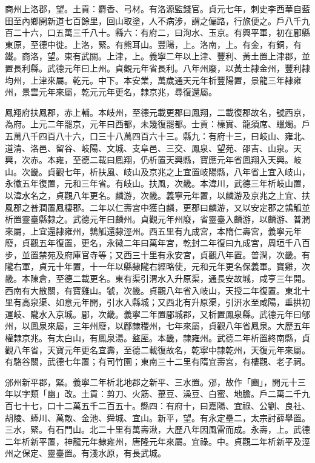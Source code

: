 \begin{pinyinscope}
 商州上洛郡，望。土貢：麝香、弓材。有洛源監錢官。貞元七年，刺史李西華自藍田至內鄉開新道七百餘里，回山取塗，人不病涉，謂之偏路，行旅便之。戶八千九百二十六，口五萬三千八十。縣六：有府二，曰洵水、玉京。有興平軍，初在郿縣東原，至德中徙。上洛，緊。有熊耳山。豐陽，上。洛南，上。有金，有銅，有鐵。商洛，望。東有武關。上津，上。義寧二年以上津、豐利、黃土置上津郡，並置長利縣。武德元年曰上州。貞觀元年省長利。八年州廢，以黃土隸金州，豐利隸均州，上津來屬。乾元。中下。本安業，萬歲通天元年析豐陽置，景龍三年隸雍州，景雲元年來屬，乾元元年更名，隸京兆，尋復還屬。



 鳳翔府扶鳳郡，赤上輔。本岐州，至德元載更郡曰鳳翔，二載復郡故名，號西京，為府。上元二年罷京，元年曰西都，未幾復罷都。士貢：榛實、龍須席、蠟燭。戶五萬八千四百八十六，口三十八萬四百六十三。縣九：有府十三，曰岐山、雍北、道清、洛邑、留谷、岐陽、文城、支阜邑、三交、鳳泉、望苑、邵吉、山泉。天興，次赤。本雍，至德二載曰鳳翔，仍析置天興縣，寶應元年省鳳翔入天興。岐山。次畿。貞觀七年，析扶風、岐山及京兆之上宜置岐陽縣，八年省上宜入岐山，永徽五年復置，元和三年省。有岐山。扶風，次畿。本湋川，武德三年析岐山置，以湋水名之，貞觀八年更名。麟游，次畿。義寧元年置，以麟游及京兆之上宜、扶風郡之普潤置鳳棲郡。二年以仁壽宮中獲白麟，更郡曰麟游，又以安定郡之鶉觚並析置靈臺縣隸之。武德元年曰麟州。貞觀元年州廢，省靈臺入麟游，以麟游、普潤來屬，上宜還隸雍州，鶉觚還隸涇州。西五里有九成宮，本隋仁壽宮，義寧元年廢，貞觀五年復置，更名，永徽二年曰萬年宮，乾封二年復曰九成宮，周垣千八百步，並置禁苑及府庫官寺等；又西三十里有永安宮，貞觀八年置。普潤，次畿。有隴右軍，貞元十年置，十一年以縣隸隴右經略使，元和元年更名保義軍。寶雞，次畿。本陳倉，至德二載更名。東有渠引渭水入升原渠，通長安故城，咸亨三年開。西南有大散關，有寶雞山。虢，次畿。貞觀八年省入岐山，天授二年復置。東北十里有高泉渠、如意元年開，引水入縣城；又西北有升原渠，引汧水至咸陽，垂拱初運岐、隴水入京城。郿，次畿。義寧二年置郿城郡，又析置鳳泉縣。武德元年曰郇州，以鳳泉來屬，三年州廢，以郿隸稷州，七年來屬，貞觀八年省鳳泉。大歷五年權隸京兆。有太白山，有鳳泉湯。盩厔。本畿，隸雍州。武德二年析置終南縣，貞觀八年省，天寶元年更名宜壽，至德二載復故名，乾寧中隸乾州，天復元年來屬。有駱谷關，武德七年置；有司竹園；東南三十二里有隋宜壽宮，有樓觀、老子祠。



 邠州新平郡，緊。義寧二年析北地郡之新平、三水置。邠，故作「豳」，開元十三年以字類「幽」改。土貢：剪刀、火筋、蓽豆、澡豆、白蜜、地膽。戶二萬二千九百七十七，口十二萬五千二百五十。縣四：有府十，曰嘉陽、宜祿、公劉、良社、胡陵、蜯川、萬敵、金池、舜城、宜山。新平，望。有永定壘二，太宗討薛舉置。三水，緊。有石門山。北二十里有萬壽湫，大歷八年因風雷而成。永壽，上。武德二年析新平置，神龍元年隸雍州，唐隆元年來屬。宜祿。中。貞觀二年析新平及涇州之保定、靈臺置。有淺水原，有長武城。




\end{pinyinscope}
